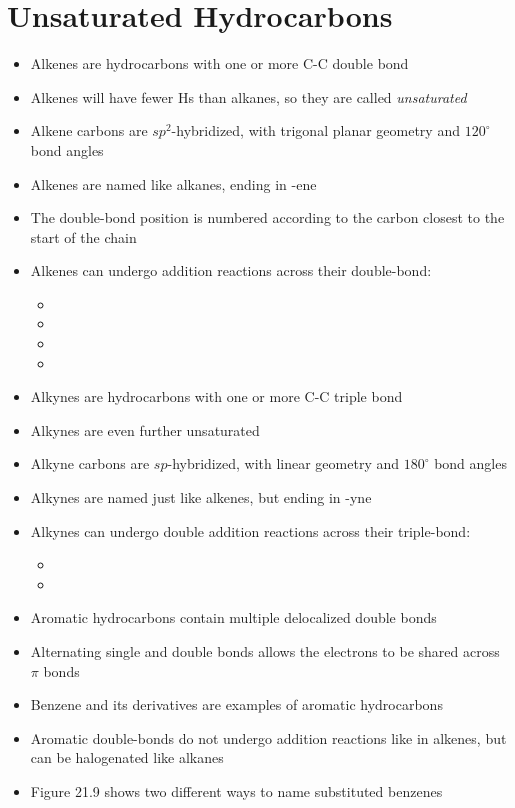 \documentclass[12pt, openany, letterpaper]{memoir}
\begin{document}
\section{Unsaturated Hydrocarbons}
\begin{itemize}
	\item Alkenes are hydrocarbons with one or more C-C double bond
	\item Alkenes will have fewer Hs than alkanes, so they are called \emph{unsaturated}
	\item Alkene carbons are $sp^2$-hybridized, with trigonal planar geometry and $120^\circ$ bond angles
	\item Alkenes are named like alkanes, ending in -ene
	\item The double-bond position is numbered according to the carbon closest to the start of the chain
	\item Alkenes can undergo addition reactions across their double-bond:
	\begin{itemize}
		\item {}
		\item {}
		\item {}
		\item {}
	\end{itemize}
	\item Alkynes are hydrocarbons with one or more C-C triple bond
	\item Alkynes are even further unsaturated
	\item Alkyne carbons are $sp$-hybridized, with linear geometry and $180^\circ$ bond angles
	\item Alkynes are named just like alkenes, but ending in -yne
	\item Alkynes can undergo double addition reactions across their triple-bond:
	\begin{itemize}
		\item {}
		\item {}
	\end{itemize}
	\item Aromatic hydrocarbons contain multiple delocalized double bonds
	\item Alternating single and double bonds allows the electrons to be shared across $\pi$ bonds
	\item Benzene and its derivatives are examples of aromatic hydrocarbons
	\item Aromatic double-bonds do not undergo addition reactions like in alkenes, but can be halogenated like alkanes
	\item Figure 21.9 shows two different ways to name substituted benzenes
\end{itemize}
\end{document}
